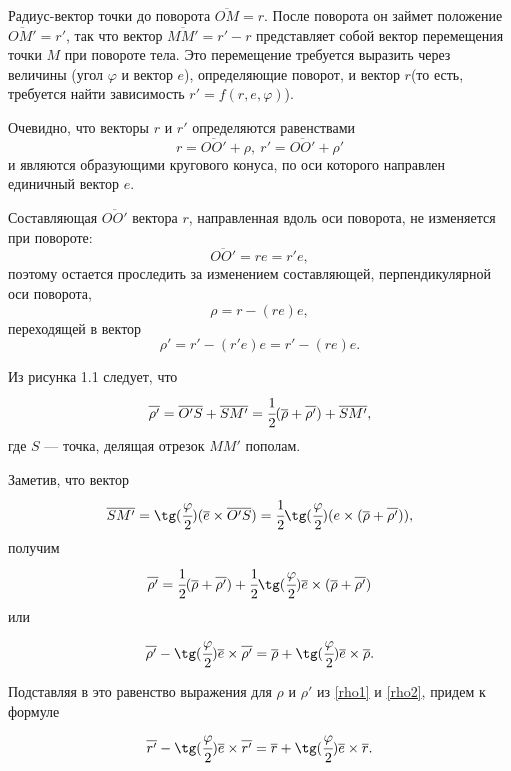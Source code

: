 \documentclass[14pt]{extreport}
\newcommand{\ov}{\overline}
\newcommand{\fr}{\cfrac}
\newcommand{\ti}{\times}
\newcommand{\rw}{\overline{r}}%
\newcommand{\rrw}{\overline{r'}}%
\newcommand{\ew}{\overline{e}}%
\newcommand{\pw}{\overline{\rho}}%
\newcommand{\ppw}{\overline{\rho'}}%
\renewcommand{\phi}{\varphi} %
\begin{document}
Радиус-вектор точки до поворота $\overline{OM}=r$. После поворота он займет положение $\overline{OM'}=r'$, так что вектор $\overline{MM'}=r'-r$ представляет собой вектор перемещения точки $M$ при повороте тела. Это перемещение требуется выразить через величины (угол $\phi$ и вектор $e$), определяю­щие поворот, и вектор $r$(то есть, требуется найти зависимость $r' = f(r, e,\phi)$).

Очевидно, что векторы $r$ и $r'$ определяются равенствами
\begin{equation}
r = \overline{OO'} + \rho,\ r' = \overline{OO'} + \rho'
\end{equation}
и являются образующими кругового конуса, по оси которого направлен единичный вектор $e$.

Составляющая $\overline{OO'}$ вектора $r$, направленная вдоль оси поворота, не изменяется при повороте:
\begin{equation}
\overline{OO'} = re = r'e,
\end{equation}
поэтому остается проследить за изменением составляющей, перпенди­кулярной оси поворота,
\begin{equation}
\label{rho1}
\rho=r-(re)e,
\end{equation}
переходящей в вектор
\begin{equation}
\label{rho2}
\rho'=r'-(r'e)e=r'-(re)e.
\end{equation}

Из рисунка 1.1 следует, что
\begin{equation}
\ppw = \ov{O'S} + \ov{SM'} = \fr{1}{2}(\pw + \ppw)+\ov{SM'},
\end{equation}
где $S$ — точка, делящая отрезок $MM'$ пополам.

Заметив, что вектор
\begin{equation}
\ov{SM'} = \tg(\fr{\phi}{2})(\ew\ti\ov{O'S}) = \fr{1}{2} \tg(\fr{\phi}{2})(e\times(\pw+\ppw)),
\end{equation}
получим
\begin{equation}
\ppw = \fr{1}{2}(\pw+\ppw) + \fr{1}{2}\tg(\fr{\phi}{2})\ew\ti(\pw+\ppw)
\end{equation}
или
\begin{equation}
\ppw - \tg(\fr{\phi}{2})\ew\ti\ppw = \pw + \tg(\fr{\phi}{2})\ew\ti\pw.
\end{equation}

Подставляя в это равенство выражения для $\rho$ и $\rho'$ из \eqref{rho1} и \eqref{rho2}, придем к формуле
\begin{equation}
\rrw - \tg(\fr{\phi}{2})\ew\ti\rrw = \rw + \tg(\fr{\phi}{2})\ew\ti\rw.
\end{equation}
\end{document}
